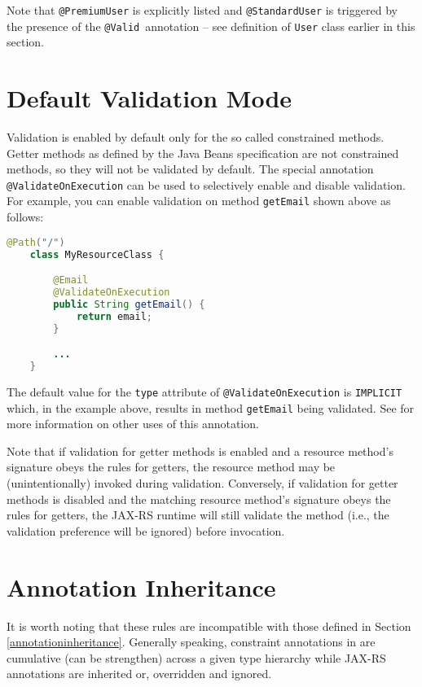 Note that \lstinline{@PremiumUser} is explicitly listed and \lstinline{@StandardUser} is triggered by the presence of
the \lstinline{@Valid}\ annotation -- see definition of \lstinline{User} class earlier in this section.

\section{Default Validation Mode}
\label{default_validation_mode}

Validation is enabled by default only for the so called constrained methods. Getter methods as defined by the Java
Beans specification are not constrained methods, so they will not be validated by default. The special annotation
\lstinline{@ValidateOnExecution} can be used to selectively enable and disable validation. For example, you can enable
validation on method \lstinline{getEmail} shown above as follows:

\begin{lstlisting}[language=Java]
    @Path("/")
    class MyResourceClass {

        @Email
        @ValidateOnExecution
        public String getEmail() {
            return email;
        }

        ...
    }
\end{lstlisting}

The default value for the \lstinline{type} attribute of \lstinline{@ValidateOnExecution} is \lstinline{IMPLICIT} which,
in the example above, results in method \lstinline{getEmail} being validated. See \cite{bv11} for more information on
other uses of this annotation.

Note that if validation for getter methods is enabled and a resource method's signature obeys the rules for getters, the
resource method may be (unintentionally) invoked during validation. Conversely, if validation for getter methods is
disabled and the matching resource method's signature obeys the rules for getters, the JAX-RS runtime will still
validate the method (i.e., the validation preference will be ignored) before invocation.

\section{Annotation Inheritance}
\label{annotation_inheritance}

    It is worth noting that these rules are incompatible with those defined in Section \ref{annotationinheritance}.
    Generally speaking, constraint annotations in are cumulative (can be strengthen) across a given type hierarchy while
    JAX-RS annotations are inherited or, overridden and ignored.

